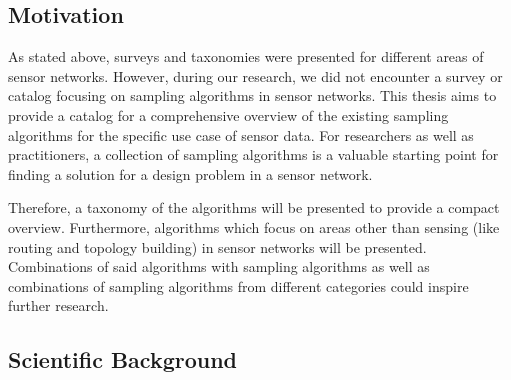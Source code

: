\subsection{Motivation}
\label{sec:motivation}

As stated above, surveys and taxonomies were presented for different areas of
sensor networks. However, during our research, we did not encounter a survey or
catalog focusing on sampling algorithms in sensor networks. This thesis aims to
provide a catalog for a comprehensive overview of the existing sampling
algorithms for the specific use case of sensor data. For researchers as well as
practitioners, a collection of sampling algorithms is a valuable starting point
for finding a solution for a design problem in a sensor network. 
\par
Therefore, a taxonomy of the algorithms will be presented to provide a compact
overview. Furthermore, algorithms which focus on areas other than sensing (like
routing and topology building) in sensor networks will be presented.
Combinations of said algorithms with sampling algorithms as well as
combinations of sampling algorithms from different categories could inspire
further research.


\subsection{Scientific Background}
\label{sec:Scientific Background}


